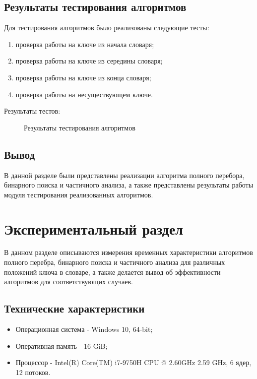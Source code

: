 \section{Результаты тестирования алгоритмов}

Для тестирования алгоритмов было реализованы следующие тесты:
\begin{enumerate}
	\item проверка работы на ключе из начала словаря;
	\item проверка работы на ключе из середины словаря;
	\item проверка работы на ключе из конца словаря;
	\item проверка работы на несуществующем ключе.
\end{enumerate}

Результаты тестов:
\begin{figure}[ph!]
	\caption{Результаты тестирования алгоритмов}
\end{figure}

\section{Вывод}
В данной разделе были представлены реализации алгоритма полного перебора, бинарного поиска и частичного анализа, а также представлены результаты работы модуля тестирования реализованных алгоритмов.

\chapter{Экспериментальный раздел}

В данном разделе описываются измерения временных характеристики алгоритмов полного перебра, бинарного поиска и частичного анализа для различных положений ключа в словаре, а также делается вывод об эффективности алгоритмов для соответствующих случаев.

\section{Технические характеристики}
\begin{itemize}
	\item Операционная система - Windows 10, 64-bit;
	\item Оперативная память - 16 GiB;
	\item Процессор - Intel(R) Core(TM) i7-9750H CPU @ 2.60GHz 2.59 GHz, 6 ядер, 12 потоков.
\end{itemize}


